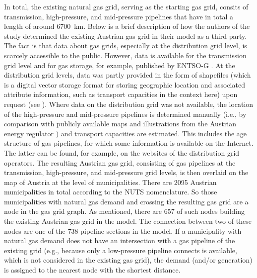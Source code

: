 In total, the existing natural gas grid, serving as the starting gas grid, consits of transmission, high-pressure, and mid-pressure pipelines that have in total a length of around \SI{6700}{km}. Below is a brief description of how the authors of the study determined the existing Austrian gas grid in their model as a third party. The fact is that data about gas grids, especially at the distribution grid level, is scarcely accessible to the public. However, data is available for the transmission grid level and for gas storage, for example, published by ENTSO-G \cite{entsog}. At the distribution grid levels, data was partly provided in the form of shapefiles (which is a digital vector storage format for storing geographic location and associated attribute information, such as transport capacities in the context here) upon request (see \cite{zwickl2023design}). Where data on the distribution grid was not available, the location of the high-pressure and mid-pressure pipelines is determined manually (i.e., by comparison with publicly available maps and illustrations from the Austrian energy regulator \cite{econtrol_grid1}) and transport capacities are estimated. This includes the age structure of gas pipelines, for which some information is available on the Internet. The latter can be found, for example, on the websites of the distribution grid operators. The resulting Austrian gas grid, consisting of gas pipelines at the transmission, high-pressure, and mid-pressure grid levels, is then overlaid on the map of Austria at the level of municipalities. There are 2095 Austrian municipalities in total according to the NUTS nomenclature. So those municipalities with natural gas demand and crossing the resulting gas grid are a node in the gas grid graph. As mentioned, there are 657 of such nodes building the existing Austrian gas grid in the model. The connection between two of these nodes are one of the 738 pipeline sections in the model. If a municipality with natural gas demand does not have an intersection with a gas pipeline of the existing grid (e.g., because only a low-pressure pipeline connects is available, which is not considered in the existing gas grid), the demand (and/or generation) is assigned to the nearest node with the shortest distance. 

